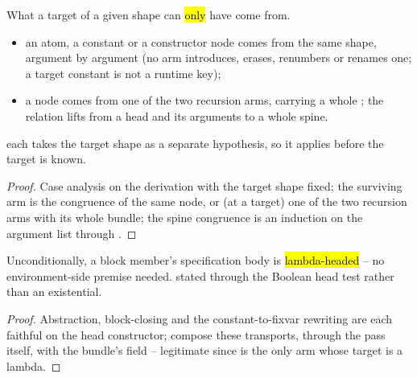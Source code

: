 \begin{lemma}
\label{lem:Lower-target_fix}
\leanok
{}
 What a target of a given shape can \hl{only} have come from.
\begin{itemize}
\item an atom, a constant or a constructor node comes from the same shape, argument by argument (no arm
introduces, erases, renumbers or renames one; a target constant is not a runtime key);
\item a  node comes from one of the two recursion arms, carrying a whole ;
the relation lifts from a head and its arguments to a whole spine.
\end{itemize}
 each takes the target shape as a separate hypothesis, so it applies before the target is
known.
\end{lemma}
\begin{proof}
\leanok
{}
 Case analysis on the derivation with the target shape fixed; the surviving arm is the
congruence of the same node, or (at a  target) one of the two recursion arms with its whole
bundle; the spine congruence is an induction on the argument list through .
\end{proof}

\begin{proposition}
\label{prop:LowerBlock-lambda_of_fixLambda}
\leanok
{}
 Unconditionally, a block member's specification body is \hl{lambda-headed} -- no
environment-side premise needed.
 stated through the Boolean head test  rather than an existential.
\end{proposition}
\begin{proof}
\leanok
{}
 Abstraction, block-closing and the constant-to-fixvar rewriting are each faithful on the
head constructor; compose these transports, through the pass itself, with the bundle's  field
-- legitimate since  is the only arm whose target is a lambda.
\end{proof}

